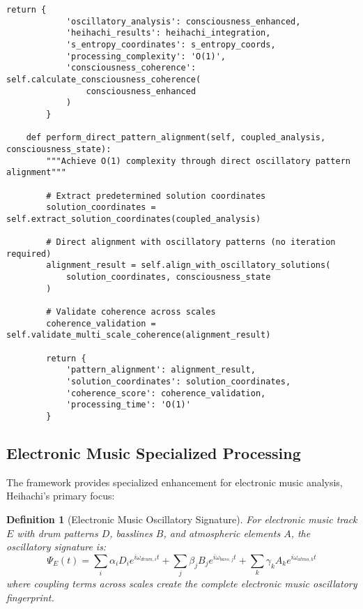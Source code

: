 \documentclass[12pt,a4paper]{article}
\newtheorem{definition}{Definition}
\begin{document}
\begin{lstlisting}[style=pythonstyle, caption=Heihachi Oscillatory Enhancement Integration]
        return {
            'oscillatory_analysis': consciousness_enhanced,
            'heihachi_results': heihachi_integration,
            's_entropy_coordinates': s_entropy_coords,
            'processing_complexity': 'O(1)',
            'consciousness_coherence': self.calculate_consciousness_coherence(
                consciousness_enhanced
            )
        }
    
    def perform_direct_pattern_alignment(self, coupled_analysis, consciousness_state):
        """Achieve O(1) complexity through direct oscillatory pattern alignment"""
        
        # Extract predetermined solution coordinates
        solution_coordinates = self.extract_solution_coordinates(coupled_analysis)
        
        # Direct alignment with oscillatory patterns (no iteration required)
        alignment_result = self.align_with_oscillatory_solutions(
            solution_coordinates, consciousness_state
        )
        
        # Validate coherence across scales
        coherence_validation = self.validate_multi_scale_coherence(alignment_result)
        
        return {
            'pattern_alignment': alignment_result,
            'solution_coordinates': solution_coordinates,
            'coherence_score': coherence_validation,
            'processing_time': 'O(1)'
        }
\end{lstlisting}

\subsection{Electronic Music Specialized Processing}

The framework provides specialized enhancement for electronic music analysis, Heihachi's primary focus:

\begin{definition}[Electronic Music Oscillatory Signature]
For electronic music track $E$ with drum patterns $D$, basslines $B$, and atmospheric elements $A$, the oscillatory signature is:
\begin{equation}
\Psi_E(t) = \sum_{i} \alpha_i D_i e^{i\omega_{drum,i} t} + \sum_{j} \beta_j B_j e^{i\omega_{bass,j} t} + \sum_{k} \gamma_k A_k e^{i\omega_{atmo,k} t}
\end{equation}
where coupling terms across scales create the complete electronic music oscillatory fingerprint.
\end{definition}
\end{document}
